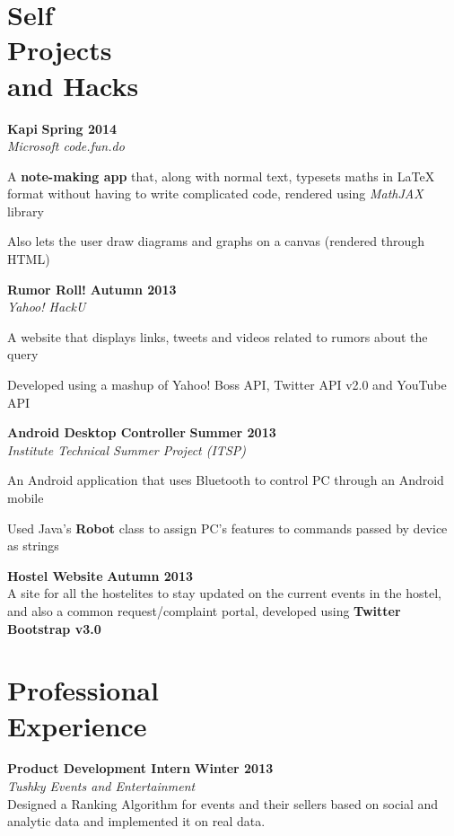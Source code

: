 \documentclass[margin,11pt]{resume}
\begin{document}
\begin{resume}
\section{\mysidestyle Self \\ Projects \\ and Hacks}
\textbf{Kapi} \hfill \textbf{Spring 2014}\\
\textsl{Microsoft code.fun.do}
\begin{list2}
\item A \textbf{note-making app} that, along with normal text, typesets maths in \LaTeX{} format without having to write complicated code, rendered using \textsl{MathJAX} library
\item Also lets the user draw diagrams and graphs on a canvas (rendered through HTML)
\end{list2}
\vspace{-2.5mm}
\textbf{Rumor Roll!} \hfill \textbf{Autumn 2013}\\
\textsl{Yahoo! HackU}
\begin{list2}
\item A website that displays links, tweets and videos related to rumors about the query
\item Developed using a mashup of Yahoo! Boss API, Twitter API v2.0 and YouTube API
\end{list2}
\vspace{-2.5mm}
\textbf{Android Desktop Controller} \hfill \textbf{Summer 2013}\\
\textsl{Institute Technical Summer Project (ITSP)}
\begin{list2}
\item An Android application that uses Bluetooth to control PC through an Android mobile 
\item Used Java's \textbf{Robot} class to assign PC's features to commands passed by device as strings
\end{list2}
\vspace{-2.5mm}
\textbf{Hostel Website} \hfill \textbf{Autumn 2013}\\
A site for all the hostelites to stay updated on the current events in the hostel, and also a common request/complaint portal, developed using \textbf{Twitter Bootstrap v3.0}



\pagebreak

\vspace{-150em}

\section{\mysidestyle Professional \\ Experience}
\textbf{Product Development Intern} \hfill \textbf{Winter 2013}\\
\textsl{Tushky Events and Entertainment}\\
Designed a Ranking Algorithm for events and their sellers based on social and analytic data and implemented it on real data.


\end{resume}
\end{document}
